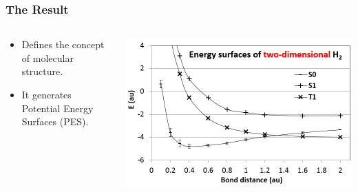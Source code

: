 \begin{frame}
    \frametitle{The Result}
    \begin{columns}[T]
        \begin{column}{0.4\textwidth}
            \vspace{2cm}
            \begin{itemize}
                \item Defines the concept of molecular structure.
                \item It generates Potential Energy Surfaces (PES).
            \end{itemize}
        \end{column}
        \begin{column}{0.5\textwidth}
            \includegraphics[width=\textwidth]{images/pot_ener_H2.png}
        \end{column}
    \end{columns}
\end{frame}

